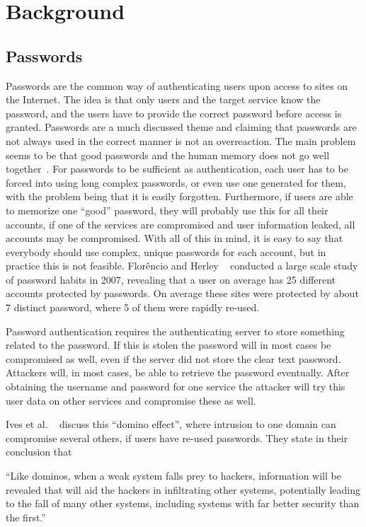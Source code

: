 \chapter{Background}\label{chp:background}


\section{Passwords}
Passwords are the common way of authenticating users upon access to sites on the Internet. The idea is that only users and the target service know the password, and the users have to provide the correct password before access is granted. Passwords are a much discussed theme and claiming that passwords are not always used in the correct manner is not an overreaction. The main problem seems to be that good passwords and the human memory does not go well together~\cite{memorability_yan}. For passwords to be sufficient as authentication, each user has to be forced into using long complex passwords, or even use one generated for them, with the problem being that it is easily forgotten. Furthermore, if users are able to memorize one ``good'' password, they will probably use this for all their accounts, if one of the services are compromised and user information leaked, all accounts may be compromised. With all of this in mind, it is easy to say that everybody should use complex, unique passwords for each account, but in practice this is not feasible. Florêncio and Herley ~\cite{password-habits} conducted a large scale study of password habits in 2007, revealing that a user on average has 25 different accounts protected by passwords. On average these sites were protected by about 7 distinct password, where 5 of them were rapidly re-used.
\par Password authentication requires the authenticating server to store something related to the password. If this is stolen the password will in most cases be compromised as well, even if the server did not store the clear text password. Attackers will, in most cases, be able to retrieve the password eventually. After obtaining the username and password for one service the attacker will try this user data on other services and compromise these as well. 
\par Ives et al. ~\cite{domino-effect} discuss this ``domino effect'', where intrusion to one domain can compromise several others, if users have re-used passwords. They state in their conclusion that
\begin{displayquote}
``Like dominos, when a weak system falls prey to hackers, information will be revealed that will aid the hackers in infiltrating other systems, potentially leading to the fall of many other systems, including systems with far better security than the first.''
\end{displayquote}

